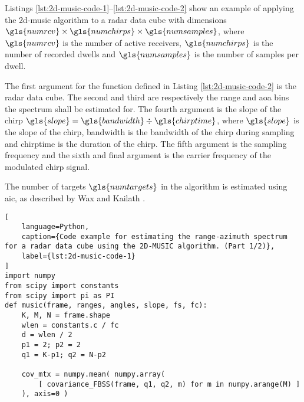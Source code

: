 Listings \ref{lst:2d-music-code-1}--\ref{lst:2d-music-code-2} show an example of applying the \gls{2d-music} algorithm to a radar data cube
with dimensions $\gls{numrcv} \times \gls{numchirps} \times \gls{numsamples}$, where $\gls{numrcv}$ is the number of active receivers, 
$\gls{numchirps}$ is the number of recorded dwells and $\gls{numsamples}$ is the number of samples per dwell.

The first argument for the function defined in Listing \ref{lst:2d-music-code-2} is the radar data cube.
The second and third are respectively the range and \gls{aoa} bins the spectrum shall be estimated for.
The fourth argument is the slope of the chirp $\gls{slope} = \gls{bandwidth} \div \gls{chirptime}$, where $\gls{slope}$ is the slope of the chirp,
\gls{bandwidth} is the bandwidth of the chirp during sampling and \gls{chirptime} is the duration of the chirp.
The fifth argument is the sampling frequency and the sixth and final argument is the carrier frequency of the modulated chirp signal.

The number of targets $\gls{numtargets}$ in the algorithm is estimated using \gls{aic}, as described by Wax and Kailath \cite{wax-kailath-85}.

\begin{lstlisting}[
    language=Python,
    caption={Code example for estimating the range-azimuth spectrum for a radar data cube using the 2D-MUSIC algorithm. (Part 1/2)},
    label={lst:2d-music-code-1}
]
import numpy
from scipy import constants
from scipy import pi as PI
def music(frame, ranges, angles, slope, fs, fc):
    K, M, N = frame.shape
    wlen = constants.c / fc
    d = wlen / 2
    p1 = 2; p2 = 2
    q1 = K-p1; q2 = N-p2

    cov_mtx = numpy.mean( numpy.array(
        [ covariance_FBSS(frame, q1, q2, m) for m in numpy.arange(M) ]
    ), axis=0 )
\end{lstlisting}
\newpage

